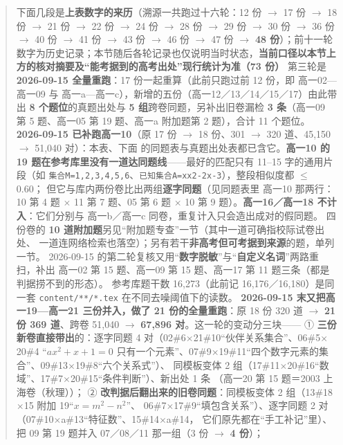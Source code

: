 \documentclass[a4paper,11pt]{article}
\begin{document}
\begin{quote}
下面几段是\textbf{上表数字的来历}（溯源一共跑过十六轮：12 份 $\to$ 17 份 $\to$ 18 份 $\to$ 21 份 $\to$ 22 份 $\to$
24 份 $\to$ 28 份 $\to$ 29 份 $\to$ 30 份 $\to$ 36 份 $\to$ 40 份 $\to$ 41 份 $\to$ 43 份 $\to$ 46 份 $\to$ 47 份 $\to$ \textbf{48 份}）；前十一轮数字为历史记录；本节随后各轮记录也仅说明当时状态，\textbf{当前口径以本节上方的核对摘要及``能考据到的高考出处''现行统计为准（73 份）}
第三轮是 \textbf{2026-09-15 全量重跑}：17 份一起重算（此前只跑过前 12 份，即
高一02---高一09 与 高一a---高一c），新增的五份（高一12／13／14／15／17）由此带出
\textbf{8 个题位}的真题出处与 \textbf{5 组}跨卷同题，另补出旧卷漏检
\textbf{3 条}（高一09 第 5 题、高一05 第 19 题、高一a 附加题第 2 题），合计 11 个题位。
\textbf{2026-09-15 已补跑高一10}（原 17 份 $\to$ 18 份、301 $\to$ 320 道、45,150 $\to$ 51,040 对）：本表、下面
的同题表与真题出处表都已含它。\textbf{高一10 的 19 题在参考库里没有一道达同题线}------最好的匹配只有
11--15 字的通用片段（如 \texttt{集合M=1,2,3,4,5,6}、\texttt{已知集合A=x\textbar{}x2-\allowbreak{}2x-\allowbreak{}3}），整段相似度都 $\leqslant$ 0.60；
但它与库内两份卷比出两组\textbf{逐字同题}（见同题表里 高一10 那两行：10 第 4 题 $\times$ 11 第 7 题、05 第 6 题 $\times$ 10 第 9 题）。\textbf{高一16／高一18 不计入}：它们分别与
高一b／高一c 同卷，重复计入只会造出成对的假同题。
四份卷的 \textbf{10 道附加题}另见``附加题专查''一节（其中一道可确指校际试卷出处、
一道连网络检索也落空）；另有若干\textbf{非高考但可考据到来源}的题，单列一节。
2026-09-15 的第二轮复核又用``\textbf{数字脱敏}''与``\textbf{自定义名词}''两路重扫，补出
高一02 第 15 题、高一09 第 15 题、高一17 第 11 题三条（都是判据捞不到的形态）。
参考库题干数 16,273（此前记 16,176／16,180）是同一套 \texttt{content/\allowbreak{}**/\allowbreak{}*.tex} 在不同去噪阈值下的读数。
\textbf{2026-09-15 末又把高一19---高一21 三份并入，做了 21 份的全量重跑}：原 18 份 320 道 $\to$ \textbf{21 份
369 道}、跨卷 51,040 $\to$ \textbf{67,896 对}。这一轮的变动分三块------
① \textbf{三份新卷直接带出}的：逐字同题 4 对（02\#6$\times$21\#10``伙伴关系集合''、06\#5$\times$20\#4
``\(ax^2+x+1=0\) 只有一个元素''、07\#9$\times$19\#11``四个数字元素的集合''、09\#13$\times$19\#8``六个关系式''）、
同模板变体 2 组（17\#11$\times$20\#16``数域''、17\#7$\times$20\#15``条件判断''）、新出处 1 条
（高一20 第 15 题＝2003 上海卷（秋理））；
② \textbf{改判据后翻出来的旧卷同题}：同模板变体 2 组（13\#18$\times$15 附加 19``\(x=m^2-n^2\)''、
06\#7$\times$17\#9``填包含关系''）、逐字同题 2 对（07\#10$\times$a\#13``特征数''、15\#14$\times$a\#14，
它们原先都在``手工补记''里）、把 09 第 19 题并入 07／08／11 那一组（3 份 $\to$ \textbf{4 份}）；

\end{quote}
\end{document}
